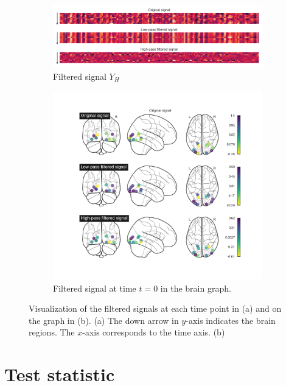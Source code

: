 \begin{figure}
    \centering
    \begin{subfigure}{\textwidth}
        \includegraphics[width=\textwidth]{img/ex_filtered_signal.png}
        \caption{Filtered signal $Y_H$}
    \label{fig/ex_filt_signal}
    \end{subfigure}
    \begin{subfigure}{\textwidth}
        \centering
        \includegraphics[width=\textwidth]{img/ex_filtered_signal_markers.png}
        \caption{Filtered signal at time $t=0$ in the brain graph.}
        \label{fig:ex_filt_markers}
    \end{subfigure}
    \caption{Visualization of the filtered signals at each time point in (a) and on the graph in (b). (a) The down arrow in $y$-axis indicates the brain regions. The $x$-axis corresponds to the time axis. (b)}
    \label{fig:visu_filt_signal}
\end{figure}

\section{Test statistic}


